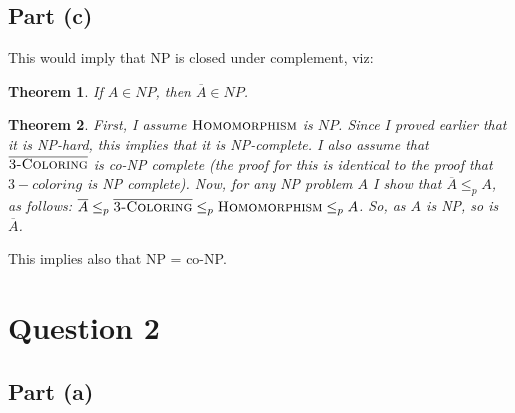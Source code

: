 \documentclass[a4paper,11pt]{scrartcl}
\newtheorem{theorem}{Theorem}
\begin{document}
\subsection*{Part (c)}
This would imply that NP is closed under complement, viz:
\begin{theorem}
    If $A \in NP$, then $\overline{A} \in NP$.
\end{theorem}
\begin{theorem}
    First, I assume $\textsc{Homomorphism}$ is $NP$. Since I proved earlier that it is NP-hard, this implies that it is NP-complete. I also assume that $\overline{\textsc{3-Coloring}}$ is co-NP complete (the proof for this is identical to the proof that $3-coloring$ is NP complete). Now, for any NP problem $A$ I show that $\overline{A} \leq_p A$, as follows: $\overline{A} \leq_p \overline{\textsc{3-Coloring}} \leq_p \textsc{Homomorphism} \leq_p A$. So, as $A$ is NP, so is $\overline{A}$.
\end{theorem}
This implies also that NP = co-NP.


\section*{Question 2}
\subsection*{Part (a)}
\end{document}
